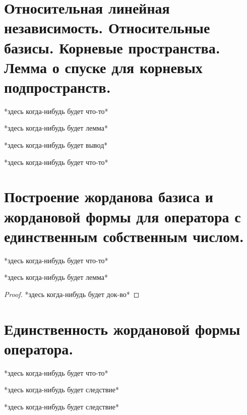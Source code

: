 \documentclass[algebra]{subfiles}
\begin{document}
    \section{Относительная линейная независимость. Относительные базисы. Корневые пространства. Лемма о спуске для корневых подпространств.}

    *здесь когда-нибудь будет что-то*

    \begin{lemma}[1]
      *здесь когда-нибудь будет лемма*
    \end{lemma}

    *здесь когда-нибудь будет вывод*

    *здесь когда-нибудь будет что-то*

    \section{Построение жорданова базиса и жордановой формы для оператора с единственным собственным числом.}

    *здесь когда-нибудь будет что-то*

    \begin{lemma}[1]
      *здесь когда-нибудь будет лемма*
    \end{lemma}

    \begin{proof}
      *здесь когда-нибудь будет док-во*
    \end{proof}

    \section{Единственность жордановой формы оператора.}

    *здесь когда-нибудь будет что-то*

    \begin{consequence}
      *здесь когда-нибудь будет следствие*
    \end{consequence}

    \begin{consequence}
      *здесь когда-нибудь будет следствие*
    \end{consequence}
\end{document}
